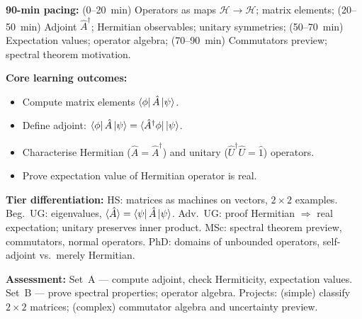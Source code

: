 \documentclass[11pt,a4paper]{article}
\begin{document}
\medskip
\begin{tcolorbox}[modulebox, title={Module~I.2 --- Lecture L03: Linear Operators: Adjoint, Hermitian \& Unitary}]
\textbf{90-min pacing:} (0--20~min) Operators as maps $\mathcal{H}\to\mathcal{H}$; matrix elements;
(20--50~min) Adjoint $\hat{A}^\dagger$; Hermitian observables; unitary symmetries;
(50--70~min) Expectation values; operator algebra;
(70--90~min) Commutators preview; spectral theorem motivation.

\medskip\textbf{Core learning outcomes:}
\begin{itemize}[leftmargin=1.4em,topsep=2pt,itemsep=1pt]
  \item Compute matrix elements $\bra{\phi}\hat{A}\ket{\psi}$.
  \item Define adjoint: $\bra{\phi}\hat{A}\ket{\psi}=\bra{\hat{A}^\dagger\phi}\ket{\psi}$.
  \item Characterise Hermitian ($\hat{A}=\hat{A}^\dagger$) and unitary ($\hat{U}^\dagger\hat{U}=\hat{1}$) operators.
  \item Prove expectation value of Hermitian operator is real.
\end{itemize}

\medskip\textbf{Tier differentiation:}
HS: matrices as machines on vectors, $2\times2$ examples.
Beg.\ UG: eigenvalues, $\langle\hat{A}\rangle=\bra{\psi}\hat{A}\ket{\psi}$.
Adv.\ UG: proof Hermitian $\Rightarrow$ real expectation; unitary preserves inner product.
MSc: spectral theorem preview, commutators, normal operators.
PhD: domains of unbounded operators, self-adjoint vs.\ merely Hermitian.

\medskip\textbf{Assessment:}
Set~A --- compute adjoint, check Hermiticity, expectation values.
Set~B --- prove spectral properties; operator algebra.
Projects: (simple) classify $2\times 2$ matrices; (complex) commutator algebra and uncertainty preview.
\end{tcolorbox}
\end{document}
